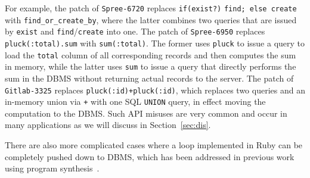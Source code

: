 %
%
For example, the patch of \texttt{Spree-6720} replaces
\texttt{if(exist?)} \texttt{find; else create} with 
\texttt{find\_or\_create\_by}, where the latter combines two queries that are issued by \texttt{exist}
and \texttt{find}/\texttt{create} into one.
The patch of \texttt{Spree-6950} replaces
\texttt{pluck(:total).sum} with \texttt{sum(:total)}. The former uses \texttt{pluck} to issue
a query to load the \texttt{total} column of all corresponding records and then
computes the sum in memory, while the latter uses \texttt{sum} to issue a 
query that directly performs the sum in the DBMS without returning actual records to the server.
The patch of {\tt Gitlab-3325} replaces \texttt{pluck(:id)+pluck(:id)}, which replaces two queries and an in-memory union via {\tt +} with one SQL \texttt{UNION} query, in effect 
moving the computation to the DBMS.
Such API misuses are very common and occur in many applications as we 
will discuss in Section~\ref{sec:dis}. 




There are also more complicated cases where a loop implemented in Ruby can be completely pushed
down to DBMS,  which has been addressed in
previous work using program synthesis~\cite{cheung:pldi13}.


